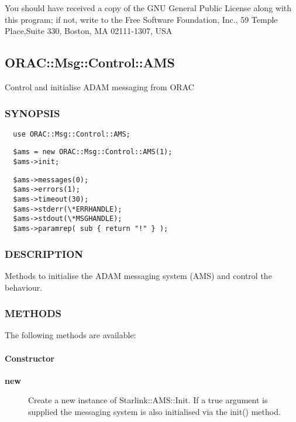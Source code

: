 You should have received a copy of the GNU General Public License along with
this program; if not, write to the Free Software Foundation, Inc., 59 Temple
Place,Suite 330, Boston, MA  02111-1307, USA

\subsection{ORAC::Msg::Control::AMS\label{ORAC::Msg::Control::AMS}}


Control and initialise ADAM messaging from ORAC

\subsubsection*{SYNOPSIS\label{ORAC::Msg::Control::AMS_SYNOPSIS}}
\begin{verbatim}
  use ORAC::Msg::Control::AMS;
\end{verbatim}
\begin{verbatim}
  $ams = new ORAC::Msg::Control::AMS(1);
  $ams->init;
\end{verbatim}
\begin{verbatim}
  $ams->messages(0);
  $ams->errors(1);
  $ams->timeout(30);
  $ams->stderr(\*ERRHANDLE);
  $ams->stdout(\*MSGHANDLE);
  $ams->paramrep( sub { return "!" } );
\end{verbatim}
\subsubsection*{DESCRIPTION\label{ORAC::Msg::Control::AMS_DESCRIPTION}}


Methods to initialise the ADAM messaging system (AMS) and control the
behaviour.

\subsubsection*{METHODS\label{ORAC::Msg::Control::AMS_METHODS}}


The following methods are available:

\paragraph*{Constructor\label{ORAC::Msg::Control::AMS_Constructor}}
\begin{description}

\item[\textbf{new}] \mbox{}

Create a new instance of Starlink::AMS::Init.
If a true argument is supplied the messaging system is also
initialised via the init() method.

\end{description}
